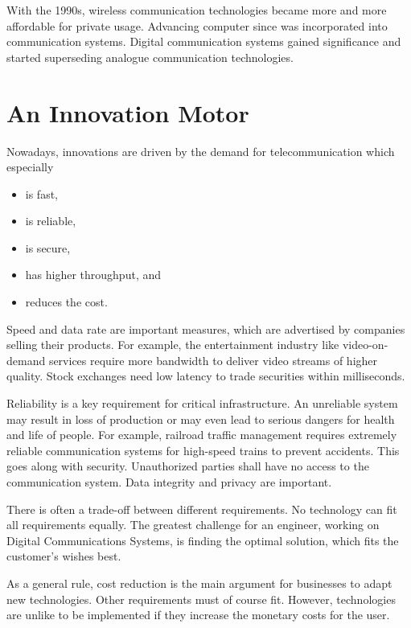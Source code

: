 \begin{refsection}
With the 1990s, wireless communication technologies became more and more affordable for private usage. Advancing computer since was incorporated into communication systems. Digital communication systems gained significance and started superseding analogue communication technologies.

\section*{An Innovation Motor}

Nowadays, innovations are driven by the demand for telecommunication which especially
\begin{itemize}
	\item is fast,
	\item is reliable,
	\item is secure,
	\item has higher throughput, and
	\item reduces the cost.
\end{itemize}

Speed and data rate are important measures, which are advertised by companies selling their products. For example, the entertainment industry like video-on-demand services require more bandwidth to deliver video streams of higher quality. Stock exchanges need low latency to trade securities within milliseconds.

Reliability is a key requirement for critical infrastructure. An unreliable system may result in loss of production or may even lead to serious dangers for health and life of people. For example, railroad traffic management requires extremely reliable communication systems for high-speed trains to prevent accidents. This goes along with security. Unauthorized parties shall have no access to the communication system. Data integrity and privacy are important.

There is often a trade-off between different requirements. No technology can fit all requirements equally. The greatest challenge for an engineer, working on Digital Communications Systems, is finding the optimal solution, which fits the customer's wishes best.

As a general rule, cost reduction is the main argument for businesses to adapt new technologies. Other requirements must of course fit. However, technologies are unlike to be implemented if they increase the monetary costs for the user.



\end{refsection}
